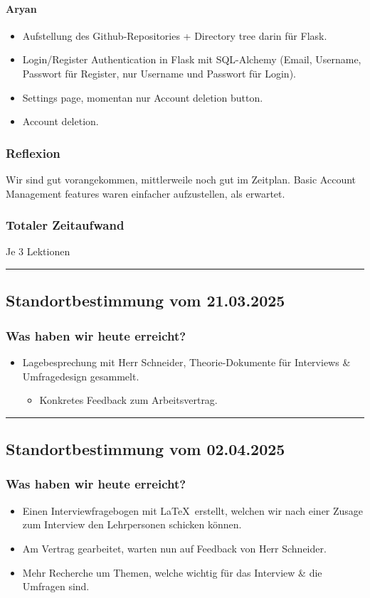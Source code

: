 \documentclass[a4paper,12pt]{article}
\newcommand{\StandortHeader}[1]{
    \subsection*{Standortbestimmung vom #1}
}
\newcommand{\StandortFooter}{
    \vspace{0.5cm}
    \hrule
    \vspace{0.5cm}
}
\begin{document}
\paragraph{Aryan}
\begin{itemize}
    \item Aufstellung des Github-Repositories + Directory tree darin für Flask.
    \item Login/Register Authentication in Flask mit SQL-Alchemy (Email, Username, Passwort für Register, nur Username und Passwort für Login).
    \item Settings page, momentan nur Account deletion button.
    \item Account deletion.
\end{itemize}

\subsubsection*{Reflexion}
Wir sind gut vorangekommen, mittlerweile noch gut im Zeitplan. Basic Account Management features waren einfacher aufzustellen, als erwartet.

\subsubsection*{Totaler Zeitaufwand}
Je 3 Lektionen
\StandortFooter

\StandortHeader{21.03.2025}
\subsubsection*{Was haben wir heute erreicht?}
\begin{itemize}
    \item Lagebesprechung mit Herr Schneider, Theorie-Dokumente für Interviews \& Umfragedesign gesammelt.
    \begin{itemize}
        \item Konkretes Feedback zum Arbeitsvertrag.
    \end{itemize}
\end{itemize}
\StandortFooter

\StandortHeader{02.04.2025}
\subsubsection*{Was haben wir heute erreicht?}
\begin{itemize}
    \item Einen Interviewfragebogen mit \LaTeX\ erstellt, welchen wir nach einer Zusage zum Interview den Lehrpersonen schicken können.
    \item Am Vertrag gearbeitet, warten nun auf Feedback von Herr Schneider.
    \item Mehr Recherche um Themen, welche wichtig für das Interview \& die Umfragen sind.
\end{itemize}
\end{document}

